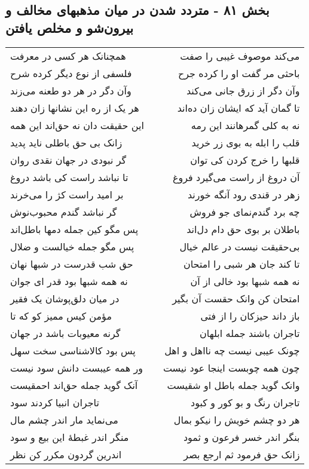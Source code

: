 \begin{center}
\section*{بخش ۸۱ - متردد شدن در میان مذهبهای مخالف و بیرون‌شو و مخلص یافتن}
\label{sec:sh081}
\begin{longtable}{l p{0.5cm} r}
همچنانک هر کسی در معرفت
&&
می‌کند موصوف غیبی را صفت
\\
فلسفی از نوع دیگر کرده شرح
&&
باحثی مر گفت او را کرده جرح
\\
وآن دگر در هر دو طعنه می‌زند
&&
وآن دگر از زرق جانی می‌کند
\\
هر یک از ره این نشانها زان دهند
&&
تا گمان آید که ایشان زان ده‌اند
\\
این حقیقت دان نه حق‌اند این همه
&&
نه به کلی گمرهانند این رمه
\\
زانک بی حق باطلی ناید پدید
&&
قلب را ابله به بوی زر خرید
\\
گر نبودی در جهان نقدی روان
&&
قلبها را خرج کردن کی توان
\\
تا نباشد راست کی باشد دروغ
&&
آن دروغ از راست می‌گیرد فروغ
\\
بر امید راست کژ را می‌خرند
&&
زهر در قندی رود آنگه خورند
\\
گر نباشد گندم محبوب‌نوش
&&
چه برد گندم‌نمای جو فروش
\\
پس مگو کین جمله دمها باطل‌اند
&&
باطلان بر بوی حق دام دل‌اند
\\
پس مگو جمله خیالست و ضلال
&&
بی‌حقیقت نیست در عالم خیال
\\
حق شب قدرست در شبها نهان
&&
تا کند جان هر شبی را امتحان
\\
نه همه شبها بود قدر ای جوان
&&
نه همه شبها بود خالی از آن
\\
در میان دلق‌پوشان یک فقیر
&&
امتحان کن وانک حقست آن بگیر
\\
مؤمن کیس ممیز کو که تا
&&
باز داند حیزکان را از فتی
\\
گرنه معیوبات باشد در جهان
&&
تاجران باشند جمله ابلهان
\\
پس بود کالاشناسی سخت سهل
&&
چونک عیبی نیست چه نااهل و اهل
\\
ور همه عیبست دانش سود نیست
&&
چون همه چوبست اینجا عود نیست
\\
آنک گوید جمله حق‌اند احمقیست
&&
وانک گوید جمله باطل او شقیست
\\
تاجران انبیا کردند سود
&&
تاجران رنگ و بو کور و کبود
\\
می‌نماید مار اندر چشم مال
&&
هر دو چشم خویش را نیکو بمال
\\
منگر اندر غبطهٔ این بیع و سود
&&
بنگر اندر خسر فرعون و ثمود
\\
اندرین گردون مکرر کن نظر
&&
زانک حق فرمود ثم ارجع بصر
\\
\end{longtable}
\end{center}
